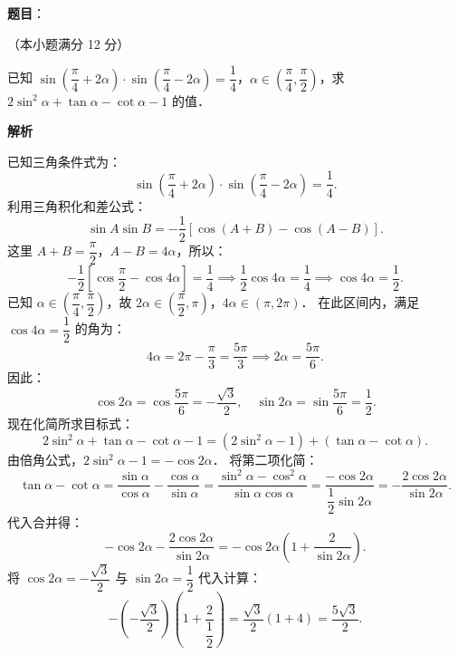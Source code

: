 \begin{answer}

\textbf{题目}：

（本小题满分 12 分）

已知 $\sin\left(\dfrac{\pi}{4} + 2\alpha\right) \cdot \sin\left(\dfrac{\pi}{4} - 2\alpha\right) = \dfrac{1}{4}$，$\alpha \in \left(\dfrac{\pi}{4}, \dfrac{\pi}{2}\right)$，求 $2\sin^2\alpha + \tan\alpha - \cot\alpha - 1$ 的值．

\textbf{解析}

已知三角条件式为：
\nopagebreak[4]
\[
\sin\left(\frac{\pi}{4} + 2\alpha\right) \cdot \sin\left(\frac{\pi}{4} - 2\alpha\right) = \frac{1}{4}.
\]
利用三角积化和差公式：
\nopagebreak[4]
\[
\sin A \sin B = -\frac{1}{2}[\cos(A + B) - \cos(A - B)].
\]
这里 $A + B = \dfrac{\pi}{2}$，$A - B = 4\alpha$，所以：
\nopagebreak[4]
\[
-\frac{1}{2}\left[\cos\frac{\pi}{2} - \cos 4\alpha\right] = \frac{1}{4} \implies \frac{1}{2}\cos 4\alpha = \frac{1}{4} \implies \cos 4\alpha = \frac{1}{2}.
\]
已知 $\alpha \in \left(\dfrac{\pi}{4}, \dfrac{\pi}{2}\right)$，故 $2\alpha \in \left(\dfrac{\pi}{2}, \pi\right)$，$4\alpha \in (\pi, 2\pi)$．
在此区间内，满足 $\cos 4\alpha = \dfrac{1}{2}$ 的角为：
\nopagebreak[4]
\[
4\alpha = 2\pi - \frac{\pi}{3} = \frac{5\pi}{3} \implies 2\alpha = \frac{5\pi}{6}.
\]
因此：
\nopagebreak[4]
\[
\cos 2\alpha = \cos\frac{5\pi}{6} = -\frac{\sqrt{3}}{2}, \quad \sin 2\alpha = \sin\frac{5\pi}{6} = \frac{1}{2}.
\]
现在化简所求目标式：
\nopagebreak[4]
\[
2\sin^2\alpha + \tan\alpha - \cot\alpha - 1 = (2\sin^2\alpha - 1) + (\tan\alpha - \cot\alpha).
\]
由倍角公式，$2\sin^2\alpha - 1 = -\cos 2\alpha$．
将第二项化简：
\nopagebreak[4]
\[
\tan\alpha - \cot\alpha = \frac{\sin\alpha}{\cos\alpha} - \frac{\cos\alpha}{\sin\alpha} = \frac{\sin^2\alpha - \cos^2\alpha}{\sin\alpha\cos\alpha} = \frac{-\cos 2\alpha}{\dfrac{1}{2}\sin 2\alpha} = -\frac{2\cos 2\alpha}{\sin 2\alpha}.
\]
代入合并得：
\nopagebreak[4]
\[
-\cos 2\alpha - \frac{2\cos 2\alpha}{\sin 2\alpha} = -\cos 2\alpha\left(1 + \frac{2}{\sin 2\alpha}\right).
\]
将 $\cos 2\alpha = -\dfrac{\sqrt{3}}{2}$ 与 $\sin 2\alpha = \dfrac{1}{2}$ 代入计算：
\nopagebreak[4]
\[
-\left(-\frac{\sqrt{3}}{2}\right)\left(1 + \frac{2}{\dfrac{1}{2}}\right) = \frac{\sqrt{3}}{2}(1 + 4) = \frac{5\sqrt{3}}{2}.
\]


\end{answer}
